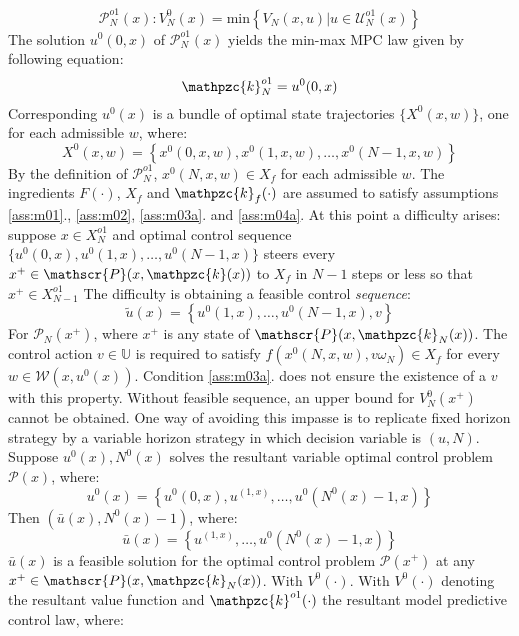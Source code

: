 \begin{equation}
    \mathscr{P}_N^{o1}(x): V_N^0(x) = \text{min} \left\{V_N(x,u)|u\in \mathscr{U}_N^{o1}(x)\right\}
\end{equation}
\noindent The solution $u^0(0,x)$ of $\mathscr{P}_N^{o1}(x)$ yields the min-max MPC law given by following equation:
\begin{equation}
    \mathpzc{k}_N^{o1}=u^0(0,x)
\end{equation}
\noindent Corresponding $u^0(x)$ is a bundle of optimal state trajectories $\{X^0(x,w)\}$, one for each admissible $w$, where:
\begin{equation}
    X^0(x,w) = \left\{x^0(0,x,w),x^0(1,x,w),\dots,x^0(N-1,x,w)\right\}
\end{equation}
\noindent By the definition of $\mathscr{P}_N^{o1}$, $x^0(N,x,w)\in X_f$ for each admissible $w$. The ingredients $F(\cdot)$, $X_f$ and $\mathpzc{k}_f(\cdot)$ are assumed to satisfy assumptions \ref{ass:m01}., \ref{ass:m02}, \ref{ass:m03a}. and \ref{ass:m04a}. At this point a difficulty arises: suppose $x\in X_N^{o1}$ and optimal control sequence $\{u^0(0,x),u^0(1,x),\dots,u^0(N-1,x)\}$ steers every $x^+ \in \mathscr{P}(x,\mathpzc{k}(x))$ to $X_f$ in $N-1$ steps or less so that $x^+ \in X_{N-1}^{o1}$ The difficulty is obtaining a feasible control \textit{sequence}:
\begin{equation}
    \tilde{u}(x)=\left\{u^0(1,x),\dots,u^0(N-1,x),v\right\}
\end{equation}
\noindent For $\mathscr{P}_N(x^+)$, where $x^+$ is any state of $\mathscr{P}(x,\mathpzc{k}_N(x))$. The control action $v \in \mathbb{U}$ is required to satisfy $f(x^0(N,x,w),v\omega_N)\in X_f$ for every $w \in \mathscr{W}(x,u^0(x))$. Condition \ref{ass:m03a}. does not ensure the existence of a $v$ with this property. Without feasible sequence, an upper bound for $V_N^0(x^+)$ cannot be obtained. One way of avoiding this impasse is to replicate fixed horizon strategy by a variable horizon strategy  \cite{michalska1993robust} in which decision variable is  $(u,N)$. Suppose $u^0(x), N^0(x)$ solves the resultant variable optimal control problem $\mathscr{P}(x)$, where:
\begin{equation}
    u^0(x) = \left\{u^0(0,x), u^(1,x),\dots,u^0(N^0(x)-1,x)\right\}
\end{equation}
\noindent Then $(\bar{u}(x),N^0(x)-1)$, where:
\begin{equation}
    \bar{u}(x)=\left\{u^(1,x),\dots,u^0(N^0(x)-1,x)\right\}
\end{equation}
\noindent $\bar{u}(x)$ is a feasible solution for the optimal control problem $\mathscr{P}(x^+)$ at any $x^+ \in \mathscr{P}(x,\mathpzc{k}_N(x))$. With $V^0(\cdot)$. With $V^0(\cdot)$ denoting the resultant value function and $\mathpzc{k}^{o1}(\cdot)$ the resultant model predictive control law, where:
